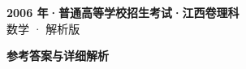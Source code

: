 \documentclass[zihao=-4, a4paper]{ctexart}
\begin{document}
\begin{center}
  {\Large\bfseries 2006 年·普通高等学校招生考试·江西卷理科}\\[4pt]
  {\large 数学 · 解析版}
\end{center}
\medskip
{}

\clearpage
{}
\begin{center}{\Large\bfseries 参考答案与详细解析}\end{center}
\medskip

\end{document}
